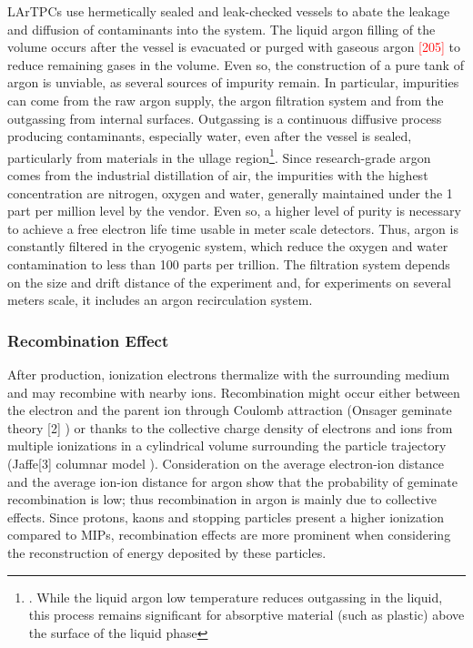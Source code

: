 LArTPCs use  hermetically sealed and leak-checked vessels to abate the leakage and diffusion of contaminants into the system. The liquid argon filling of the volume occurs after the vessel is evacuated or purged with gaseous argon \textcolor{red}{[205]} to reduce remaining gases in the volume. Even so, the construction of a pure tank of argon is unviable, as several sources of impurity remain.  In particular, impurities can come from the raw argon supply, the argon filtration system and from the outgassing from internal surfaces. Outgassing is a continuous diffusive process  producing contaminants, especially water, even after the vessel is sealed, particularly from materials in the ullage region\footnote{.  While the liquid argon low temperature reduces outgassing in the liquid, this process remains significant for absorptive material (such as plastic) above the surface of the liquid phase}.  Since research-grade argon comes from the industrial distillation of air, the impurities with the highest concentration are nitrogen, oxygen and water, generally maintained under the 1 part per million level by the vendor.  Even so, a higher level of purity is necessary to achieve a free electron life time usable in meter scale detectors. Thus, argon  is constantly  filtered in the cryogenic system, which reduce the oxygen and water contamination to less than 100 parts per trillion. The filtration system depends on the size and drift distance of the experiment and, for experiments on several meters scale, it includes an argon recirculation system.



\subsubsection{Recombination Effect}
After production, ionization electrons thermalize with the surrounding medium and may recombine with nearby ions. Recombination might occur either between the electron and the parent ion through Coulomb attraction (Onsager geminate theory  [2] ) or thanks to the collective charge density of electrons and ions from multiple ionizations in a cylindrical volume surrounding the particle trajectory (Jaffe[3]  columnar model ). 
Consideration on the  average electron-ion distance and the average ion-ion distance for argon show that the probability of geminate recombination is low; thus recombination in argon is mainly due to collective effects\cite{1748-0221-8-08-P08005}.  Since protons, kaons and stopping particles present a higher ionization compared to MIPs, recombination effects are more prominent when considering the reconstruction of energy deposited by these particles.

